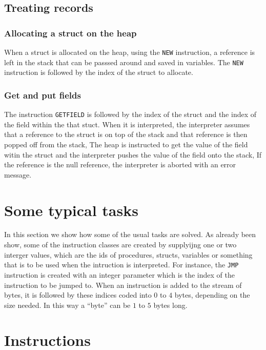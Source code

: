 \documentclass[11pt]{article}
\begin{document}
\subsection{Treating records}
\label{sec:orgcc9c1d1}
\subsubsection{Allocating a struct on the heap}
\label{sec:org0506cbc}
When a struct is allocated on the heap, using the \texttt{NEW} instruction, a
reference is left in the stack that can be passsed around and saved in
variables. The \texttt{NEW} instruction is followed by the index of the struct to
allocate.


\subsubsection{Get and put fields}
\label{sec:org53bf3d7}


The instruction \texttt{GETFIELD} is followed by the index of the struct and the
index of the field within the that stuct. When it is interpreted, the
interpreter assumes that a reference to the struct is on top of the stack
and that reference is then popped off from the stack, The heap is
instructed to get the value of the field witin the struct and the
interpreter pushes the value of the field onto the stack, If the reference
is the null reference, the interpreter is aborted with an error message.
\section{Some typical tasks}
\label{sec:orga85af9a}
\label{org679199e}


In this section we show how some of the usual tasks are solved. As already
been show, some of the instruction classes are created by supplyijng one or
two interger values, which are the ids of procedures, structs, variables or
something that is to be used when the intruction is interpreted. For
instance, the \texttt{JMP} instruction is created with an integer parameter which
is the index of the instruction to be jumped to.  When an instruction is
added to the stream of bytes, it is followed by these indices coded into
\(0\) to \(4\) bytes, depending on the size needed. In this way a ``byte'' can
be \(1\) to \(5\) bytes long.
\section{Instructions}
\label{sec:org0a2c8aa}
\end{document}

